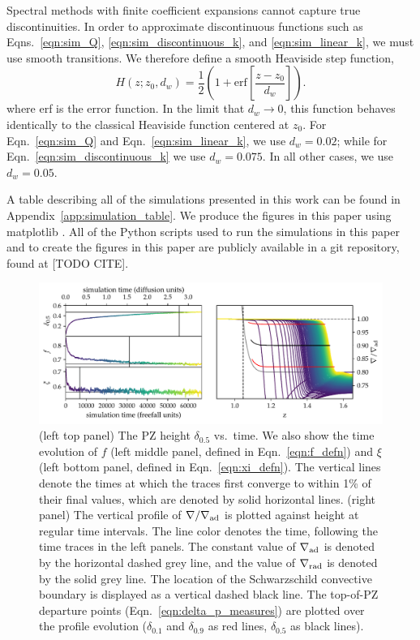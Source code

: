 \documentclass[twocolumn]{aastex631}
\newcommand{\gradrad}{\ensuremath{\nabla_{\rm{rad}}}}
\newcommand{\gradad}{\ensuremath{\nabla_{\rm{ad}}}}
\newcommand{\justgrad}{\ensuremath{\nabla}}
\begin{document}
Spectral methods with finite coefficient expansions cannot capture true discontinuities.
In order to approximate discontinuous functions such as Eqns.~\ref{eqn:sim_Q}, \ref{eqn:sim_discontinuous_k}, and \ref{eqn:sim_linear_k}, we must use smooth transitions.
We therefore define a smooth Heaviside step function,
\begin{equation}
H(z; z_0, d_w) = \frac{1}{2}\left(1 + \mathrm{erf}\left[\frac{z - z_0}{d_w}\right]\right).
\label{eqn:heaviside}
\end{equation}
where erf is the error function.
In the limit that $d_w \rightarrow 0$, this function behaves identically to the classical Heaviside function centered at $z_0$.
For Eqn.~\ref{eqn:sim_Q} and Eqn.~\ref{eqn:sim_linear_k}, we use $d_w = 0.02$; while for Eqn.~\ref{eqn:sim_discontinuous_k} we use $d_w = 0.075$.
In all other cases, we use $d_w = 0.05$.

A table describing all of the simulations presented in this work can be found in Appendix~\ref{app:simulation_table}.
We produce the figures in this paper using matplotlib \citep{hunter2007, mpl3.3.4}.
All of the Python scripts used to run the simulations in this paper and to create the figures in this paper are publicly available in a git repository, found at [TODO CITE].

\begin{figure}[t]
\centering
\includegraphics[width=\textwidth]{time_evolution.pdf}
\caption{
(left top panel) The PZ height $\delta_{0.5}$ vs.~time.
We also show the time evolution of $f$ (left middle panel, defined in Eqn.~\ref{eqn:f_defn}) and $\xi$ (left bottom panel, defined in Eqn.~\ref{eqn:xi_defn}).
The vertical lines denote the times at which the traces first converge to within 1\% of their final values, which are denoted by solid horizontal lines.
(right panel) The vertical profile of $\justgrad/\gradad$ is plotted against height at regular time intervals.
The line color denotes the time, following the time traces in the left panels.
The constant value of $\gradad$ is denoted by the horizontal dashed grey line, and the value of $\gradrad$ is denoted by the solid grey line.
The location of the Schwarzschild convective boundary is displayed as a vertical dashed black line.
The top-of-PZ departure points (Eqn.~\ref{eqn:delta_p_measures}) are plotted over the profile evolution ($\delta_{0.1}$ and $\delta_{0.9}$ as red lines, $\delta_{0.5}$ as black lines).
\label{fig:time_evolution}
}
\end{figure}
\end{document}
